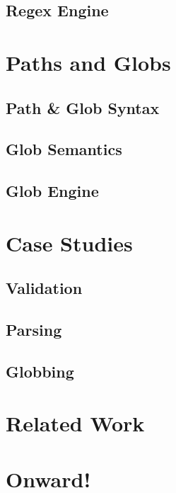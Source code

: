 \documentclass[sigplan,10pt,review]{acmart}
\begin{document}
\subsection{Regex Engine}

\section{Paths and Globs}

\subsection{Path \& Glob Syntax}

\subsection{Glob Semantics}

\subsection{Glob Engine}

\section{Case Studies}

\subsection{Validation}

\subsection{Parsing}

\subsection{Globbing}

\section{Related Work}

\section{Onward!}




\end{document}
